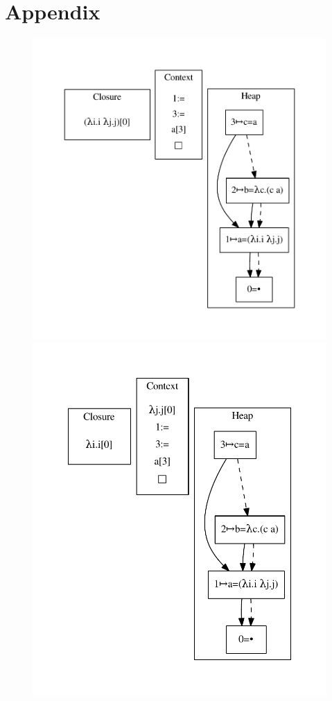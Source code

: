 \section{Appendix}
\begin{figure}
\includegraphics[width=\linewidth/3]{figures/12.pdf}
\includegraphics[width=\linewidth/3]{figures/13.pdf}

\end{figure}
